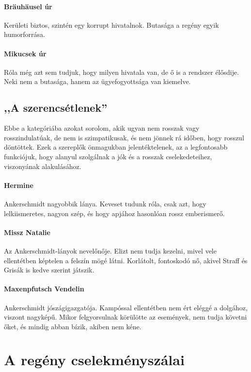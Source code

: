 \documentclass{thesis-ekf}
\theoremstyle{definition}
\begin{document}
    \paragraph{Bräuhäusel úr}
    Kerületi biztos, szintén egy korrupt hivatalnok.
    Butasága a regény egyik humorforrása.

    \paragraph{Mikucsek úr}
    Róla még azt sem tudjuk, hogy milyen hivatala van, de ő is a rendszer élősdije.
    Neki nem a butasága, hanem az ügyefogyottsága van kiemelve.

    \subsection{,,A szerencsétlenek''}

    Ebbe a kategóriába azokat sorolom, akik ugyan nem rosszak vagy rosszindulatúak, de nem is szimpatikusak,
        és nem jönnek rá időben, hogy rosszul döntöttek.
    Ezek a szereplők önmagukban jelentéktelenek, az a legfontosabb funkciójuk, hogy alanyul szolgálnak
        a jók és a rosszak cselekedeteihez, viszonyának alakulásához.

    \paragraph{Hermine}
    Ankerschmidt nagyobbik lánya.
    Keveset tudunk róla, csak azt, hogy lelkiismeretes, nagyon szép, és hogy apjához hasonlóan rossz emberismerő.

    \paragraph{Missz Natalie}
    Az Ankerschmidt-lányok nevelőnője.
    Elizt nem tudja kezelni, mivel vele ellentétben képtelen a felszín mögé látni.
    Korlátolt, fontoskodó nő, akivel Straff és Grisák is kedve szerint játszik.

    \paragraph{Maxenpfutsch Vendelin}
    Ankerschmidt jószágigazgatója.
    Kampóssal ellentétben nem ért eléggé a dolgához, viszont nagyképű.
    Mikor felgyorsulnak körülötte az események, nem tudja követni őket, és mindig abban bízik, akiben nem kéne.

    \section{A regény cselekményszálai}
\end{document}
